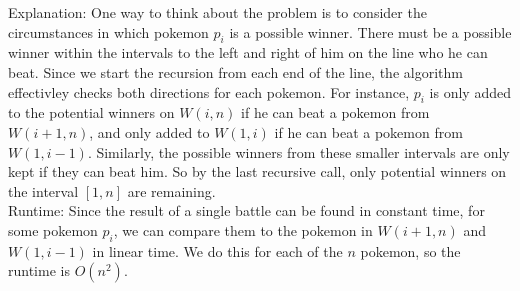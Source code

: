 \documentclass{article}
\begin{document}
Explanation: One way to think about the problem is to consider the circumstances in which pokemon $p_i$ is a possible winner. There must be a possible winner within the intervals to the left and right of him on the line who he can beat. Since we start the recursion from each end of the line, the algorithm effectivley checks both directions for each pokemon. For instance, $p_i$ is only added to the potential winners on $W(i, n)$ if he can beat a pokemon from $W(i + 1, n)$, and only added to $W(1, i)$ if he can beat a pokemon from $W(1, i - 1)$. Similarly, the possible winners from these smaller intervals are only kept if they can beat him. So by the last recursive call, only potential winners on the interval $[1, n]$ are remaining.  \\[0.5ex]
Runtime: Since the result of a single battle can be found in constant time, for some pokemon $p_i$, we can compare them to the pokemon in $W(i + 1, n)$ and $W(1, i - 1)$ in linear time. We do this for each of the $n$ pokemon, so the runtime is $O(n^2)$.

    
\end{document}
